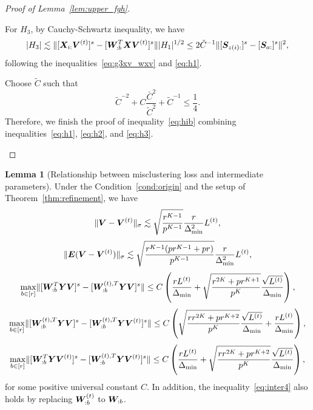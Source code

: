 \documentclass[lettersize,onecolumn,journal]{IEEEtran}
\theoremstyle{definition}
\newtheorem{lem}{Lemma}
\theoremstyle{definition}
\newcommand{\of}[1]{\left(#1\right)}
\begin{document}
\begin{proof}[Proof of Lemma~\ref{lem:upper_fgh}]
\begin{enumerate}[wide]
      For $H_3$,  by Cauchy-Schwartz inequality, we have 
    \begin{equation}\label{eq:h3}
         |H_3| \lesssim \onormSize{}{[\mX_{i:} \mV^{(t)}]^s  -  [  \mW_{:b}^T \mX \mV^{(t)} ]^s} |H_1|^{1/2} \leq 2 \tilde C^{-1} \onormSize{}{ [ \mS_{z(i):} ]^s - [ \mS_{a:}]^s }^2,
    \end{equation}
    following the inequalities~\eqref{eq:g3xv_wxv} and \eqref{eq:h1}.
    
    Choose $\tilde C$ such that 
    \begin{equation}\label{eq:tilde_c2}
        \tilde C^{-2} + C \frac{\bar C^2}{ \tilde C^2} + \tilde C^{-1} \leq \frac{1}{4}.
    \end{equation}
     Therefore, we finish the proof of inequality~\eqref{eq:hib} combining inequalities~\eqref{eq:h1}, \eqref{eq:h2}, and \eqref{eq:h3}.

\end{enumerate}


\end{proof}


     \begin{lem}[Relationship between misclustering loss and intermediate parameters]\label{lem:intermediate} Under the Condition~\ref{cond:origin} and the setup of Theorem~\ref{thm:refinement}, we have
    \begin{equation}\label{eq:inter1}
        \onormSize{}{\mV - \mV^{(t)}}_{\sigma} \lesssim \sqrt{\frac{r^{K-1}}{p^{K-1}}}  \frac{r}{\Delta_{\min}^2} L^{(t)},
    \end{equation}
    \begin{equation}\label{eq:inter2}
        \onormSize{}{\mE (\mV - \mV^{(t)})}_{\sigma} \lesssim \sqrt{ \frac{r^{K-1}(p r^{K-1} + p r)}{p^{K-1}}} 
 \frac{r}{\Delta_{\min}^2} L^{(t)},
 \end{equation}
 \begin{equation}\label{eq:inter3}
     \max_{b \in [r]} \onormSize{}{ [ \mW_{:b}^T \mY \mV ]^s   -  [ \mW_{:b}^{(t), T} \mY \mV  ]^s } \leq C \of{\frac{r L^{(t)}}{\Delta_{\min}} + \sqrt{ \frac{r^{2K} + pr^{K+1}}{p^{K}} } \frac{\sqrt{L^{(t)}}}{\Delta_{\min}}},
 \end{equation}
 \begin{equation}\label{eq:inter4}
     \max_{b \in [r]} \onormSize{}{  [  \mW_{:b}^{(t), T}  \mY \mV]^s - [  \mW_{:b}^{(t), T}  \mY \mV^{(t)}]^s } \leq C  \of{ \sqrt{ \frac{rr^{2K} + p r^{K+2}}{p^{K}}}  \frac{\sqrt{L^{(t)}}}{\Delta_{\min}} +  \frac{r L^{(t)}}{\Delta_{\min}}},
     \end{equation}
    \begin{equation}\label{eq:inter5}
         \max_{b \in [r]} \onormSize{}{ [\mW_{:b}^T \mY \mV^{(t)} ]^s   -  [ \mW_{:b}^{(t), T} \mY \mV^{(t)} ]^s } \leq C \of{\frac{rL^{(t)}}{\Delta_{\min}} + \sqrt{ \frac{rr^{2K} + p r^{K+2}}{p^{K}}}  \frac{\sqrt{L^{(t)}}}{\Delta_{\min}}},
    \end{equation}
    for some positive universal constant $C$. In addition, the inequality~\eqref{eq:inter4} also holds by replacing $\bm{W}_{:b}^{(t)}$ to $\bm{W}_{:b}$.
    \end{lem}
        
\end{document}
